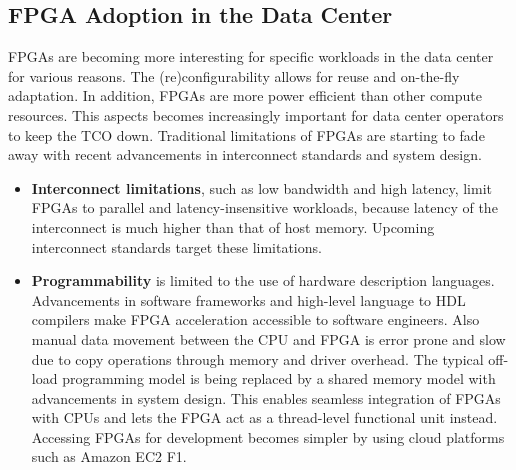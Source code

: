 \subsection{FPGA Adoption in the Data Center}
\label{sec:adopt}
FPGAs are becoming more interesting for specific workloads in the data center for various reasons. The (re)configurability allows for reuse and on-the-fly adaptation.
In addition, FPGAs are more power efficient than other compute resources. This aspects becomes increasingly important for data center operators to keep the TCO down. Traditional limitations of FPGAs are starting to fade away with recent advancements in interconnect standards and system design.

\begin{itemize}
  \item{\textbf{Interconnect limitations}, such as low bandwidth and high latency, limit FPGAs to parallel and latency-insensitive workloads, because latency of the interconnect is much higher than that of host memory. Upcoming interconnect standards target these limitations.}
  \item{\textbf{Programmability} is limited to the use of hardware description languages. Advancements in software frameworks and high-level language to HDL compilers make FPGA acceleration accessible to software engineers. Also manual data movement between the CPU and FPGA is error prone and slow due to copy operations through memory and driver overhead. The typical off-load programming model is being replaced by a shared memory model with advancements in system design. This enables seamless integration of FPGAs with CPUs and lets the FPGA act as a thread-level functional unit instead. Accessing FPGAs for development becomes simpler by using cloud platforms such as Amazon EC2 F1.}
\end{itemize}



